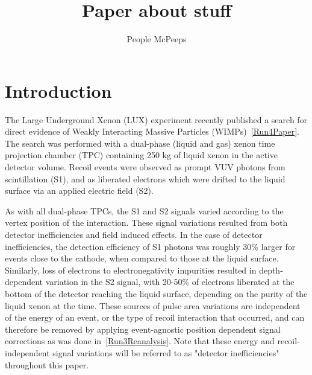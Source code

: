\documentclass[a4paper,10pt,twocolumn]{article}
\title{Paper about stuff}
\author{People McPeeps}
\begin{document}


\section{Introduction}\label{section:Intro}

The Large Underground Xenon (LUX) experiment recently published a search for direct evidence of Weakly Interacting Massive Particles (WIMPs)~\ref{Run4Paper}.  The search was performed with a dual-phase (liquid and gas) xenon time projection chamber (TPC) containing 250 kg of liquid xenon in the active detector volume.  Recoil events were observed as prompt VUV photons from scintillation (S1), and as liberated electrons which were drifted to the liquid surface via an applied electric field (S2). 


As with all dual-phase TPCs, the S1 and S2 signals varied according to the vertex position of the interaction.  These signal variations resulted from both detector inefficiencies and field induced effects.  In the case of detector inefficiencies, the detection efficiency of S1 photons was roughly 30\% larger for events close to the cathode, when compared to those at the liquid surface. Similarly, loss of electrons to electronegativity impurities resulted in depth-dependent variation in the S2 signal, with 20-50\% of electrons liberated at the bottom of the detector reaching the liquid surface, depending on the purity of the liquid xenon at the time.  These sources of pulse area variations are independent of the energy of an event, or the type of recoil interaction that occurred, and can therefore be removed by applying event-agnostic position dependent signal corrections as was done in~\ref{Run3Reanalysis}.  Note that these energy and recoil-independent signal variations will be referred to as "detector inefficiencies" throughout this paper. 
\end{document}

